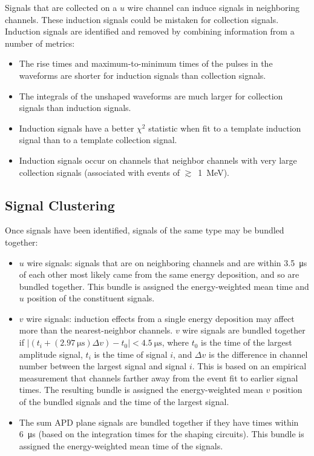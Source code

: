 \documentclass[herrin-thesis.tex]{subfiles}
\begin{document}
Signals that are collected on a \(u\) wire channel can induce signals in neighboring channels. These induction signals could be mistaken for collection signals. Induction signals are identified and removed by combining information from a number of metrics:
\begin{itemize}
\item The rise times and maximum-to-minimum times of the pulses in the waveforms are shorter for induction signals than collection signals.
\item The integrals of the unshaped waveforms are much larger for collection signals than induction signals.
\item Induction signals have a better \(\chi^2\) statistic when fit to a template induction signal than to a template collection signal.
\item Induction signals occur on channels that neighbor channels with very large collection signals (associated with events of \(\gtrsim\)~\SI{1}{\MeV}).
\end{itemize}

\subsection{Signal Clustering}
\label{sec:data_clustering}
Once signals have been identified, signals of the same type may be bundled together:
\begin{itemize}
\item \(u\) wire signals: signals that are on neighboring channels and are within \SI{3.5}{\micro\s} of each other most likely came from the same energy deposition, and so are bundled together. This bundle is assigned the energy-weighted mean time and \(u\) position of the constituent signals.
\item \(v\) wire signals: induction effects from a single energy deposition may affect more than the nearest-neighbor channels. \(v\) wire signals are bundled together if \(|(t_{i} + (\SI{2.97}{\micro\s})\Delta v) - t_0|< \SI{4.5}{\micro\s}\), where \(t_0\) is the time of the largest amplitude signal, \(t_i\) is the time of signal \(i\), and \(\Delta v\) is the difference in channel number between the largest signal and signal \(i\). This is based on an empirical measurement that channels farther away from the event fit to earlier signal times. The resulting bundle is assigned the energy-weighted mean \(v\) position of the bundled signals and the time of the largest signal.
\item The sum APD plane signals are bundled together if they have times within \SI{6}{\micro\s} (based on the integration times for the shaping circuits). This bundle is assigned the energy-weighted mean time of the signals.
\end{itemize}
\end{document}
